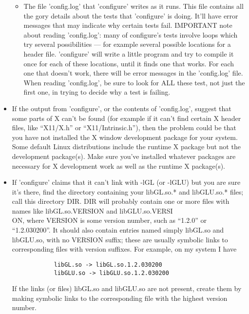 \documentclass[12pt,a4paper]{article}
\begin{document}
\begin{itemize}
\begin{itemize}
              \item The file 'config.log' that 'configure' writes as it runs. This
                file contains all the gory details about the tests that
                'configure' is doing. It'll have error messages that may
                indicate why certain tests fail. IMPORTANT note about reading
                'config.log': many of configure's tests involve loops which try
                several possibilities --- for example several possible locations
                for a header file. 'configure' will write a little program and
                try to compile it once for each of these locations, until it
                finds one that works. For each one that doesn't work, there will
                be error messages in the 'config.log' file. When reading
                'config.log', be sure to look for ALL these test, not just the
                first one, in trying to decide why a test is failing.
             \end{itemize}
          \item If the output from 'configure', or the contents of 'config.log',
            suggest that some parts of X can't be found (for example if it can't
            find certain X header files, like ``X11/X.h'' or ``X11/Intrinsic.h''),
            then the problem could be that you have not installed the X window
            development package for your system. Some default Linux
            distributions include the runtime X package but not the development
            package(s). Make sure you've installed whatever packages are
            necessary for X development work as well as the runtime X package(s).

          \item If 'configure' claims that it can't link with -lGL (or -lGLU) but
            you are sure it's there, find the directory containing your
            libGL.so.* and libGLU.so.* files; call this directory DIR. DIR will
            probably contain one or more files with names like libGL.so.VERSION
            and libGLU.so.VERSI\\ ON, where VERSION is some version number,
            such as ``1.2.0'' or ``1.2.030200''. It should also contain entries
            named simply libGL.so and libGLU.so, with no VERSION suffix; these
            are usually symbolic links to corresponding files with version
            suffixes. For example, on my system I have
	    \begin{verbatim}
            libGL.so -> libGL.so.1.2.030200
            libGLU.so -> libGLU.so.1.2.030200
	    \end{verbatim}
            If the links (or files) libGL.so and libGLU.so are not present,
            create them by making symbolic links to the corresponding file with
            the highest version number.


\end{itemize}
\end{document}
